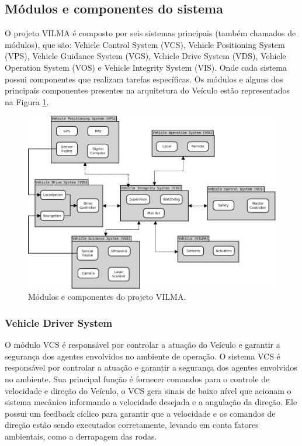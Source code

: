 \documentclass[conference]{IEEEtran}
\begin{document}
\subsection{Módulos e componentes do sistema}\label{subsec:system_modules_components}

O projeto VILMA é composto por seis sistemas principais (também chamados de módulos), que são: Vehicle Control System (VCS), Vehicle Positioning System (VPS), Vehicle Guidance System (VGS), Vehicle Drive System (VDS), Vehicle Operation System (VOS) e Vehicle Integrity System (VIS). Onde cada sistema possui componentes que realizam tarefas específicas. Os módulos e alguns dos principais componentes presentes na arquitetura do Veículo estão representados na Figura \ref{fig:componentes_sistema}.

\begin{figure}[!ht]
	\centering
	\includegraphics[scale=0.30]{files/VILMA_MODULES_COMPONENTS.png}
	\caption{Módulos e componentes do projeto VILMA.}
	\label{fig:componentes_sistema}
\end{figure}

\subsubsection{Vehicle Driver System}\label{subsec:vds}

O  módulo VCS é responsável por controlar a atuação do Veículo e garantir a segurança dos agentes envolvidos no ambiente de operação. O sistema VCS é responsável por controlar a atuação e garantir a segurança dos agentes envolvidos no ambiente. Sua principal função é fornecer comandos para o controle de velocidade e direção do Veículo, o VCS gera sinais de baixo nível que acionam o sistema mecânico informando a velocidade desejada e a angulação da direção. Ele possui um feedback cíclico para garantir que a velocidade e os comandos de direção estão sendo executados corretamente, levando em conta fatores ambientais, como a derrapagem das rodas.
\end{document}
